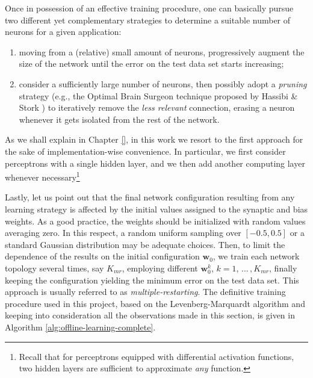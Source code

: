 \documentclass[12pt, a4paper, twoside, openright]{report}
\numberwithin{equation}{chapter}
\theoremstyle{theorem}
\theoremstyle{definition}
\theoremstyle{remark}
\theoremstyle{proposition}
\numberwithin{figure}{chapter}
\begin{document}
		Once in possession of an effective training procedure, one can basically pursue two different yet complementary strategies to determine a suitable number of neurons for a given application:
		\begin{enumerate}[label=(\alph*)]
			\item moving from a (relative) small amount of neurons, progressively augment the size of the network until the error on the test data set starts increasing;
			\item consider a sufficiently large number of neurons, then possibly adopt a \emph{pruning} strategy (e.g., the Optimal Brain Surgeon technique proposed by Hassibi \& Stork \cite{OBS}) to iteratively remove the \emph{less relevant} connection, erasing a neuron whenever it gets isolated from the rest of the network.
		\end{enumerate}
		As we shall explain in Chapter \ref{}, in this work we resort to the first approach for the sake of implementation-wise convenience. In particular, we first consider perceptrons with a single hidden layer, and we then add another computing layer whenever necessary\footnote{Recall that for perceptrons equipped with differential activation functions, two hidden layers are sufficient to approximate \emph{any} function.}
		
		Lastly, let us point out that the final network configuration resulting from any learning strategy is affected by the initial values assigned to the synaptic and bias weights. As a good practice, the weights should be initialized with random values averaging zero. In this respect, a random uniform sampling over $[-0.5,0.5]$ or a standard Gaussian distribution may be adequate choices. Then, to limit the dependence of the results on the initial configuration $\mathbf{w}_0$, we train each network topology several times, say $K_{mr}$, employing different $\mathbf{w}_0^k$, $k = 1, \, \ldots \, , K_{mr}$, finally keeping the configuration yielding the minimum error on the test data set. This approach is usually referred to as \emph{multiple-restarting}. The definitive training procedure used in this project, based on the Levenberg-Marquardt algorithm and keeping into consideration all the observations made in this section, is given in Algorithm \ref{alg:offline-learning-complete}.
			
\end{document}
